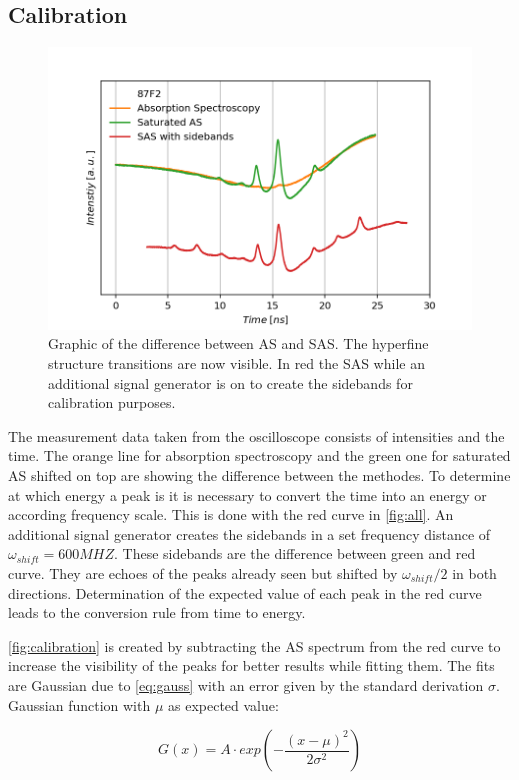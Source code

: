\documentclass[]{article}
\begin{document}
\subsection{Calibration}
\begin{figure}[H]
\centering
\includegraphics[width=.8\textwidth]{Plots/Calibration_Second_All.png}
\caption{Graphic of the difference between AS and SAS. The hyperfine structure transitions are now visible. In red the SAS while an additional signal generator is on to create the sidebands for calibration purposes.}
\label{fig:all}
\end{figure}

The measurement data taken from the oscilloscope consists of intensities and the time. The orange line for absorption spectroscopy and the green one for saturated AS shifted on top are showing the difference between the methodes.
To determine at which energy a peak is it is necessary to convert the time into an energy or according frequency scale. This is done with the red curve in \autoref{fig:all}. An additional signal generator creates the sidebands in a set frequency distance of $\omega_{shift}=600MHZ$. These sidebands are the difference between green and red curve. They are echoes of the peaks already seen but shifted by $\omega_{shift}/2$ in both directions. Determination of the expected value of each peak in the red curve leads to the conversion rule from time to energy. 

\autoref{fig:calibration} is created by subtracting the AS spectrum from the red curve to increase the visibility of the peaks for better results while fitting them. The fits are Gaussian due to \autoref{eq:gauss} with an error given by the standard derivation $\sigma$. Gaussian function with $\mu$ as expected value:

\begin{equation}
G(x) = A \cdot exp\left( -\frac{(x-\mu)^2}{2\sigma^2} \right)
\end{equation}
\end{document}
